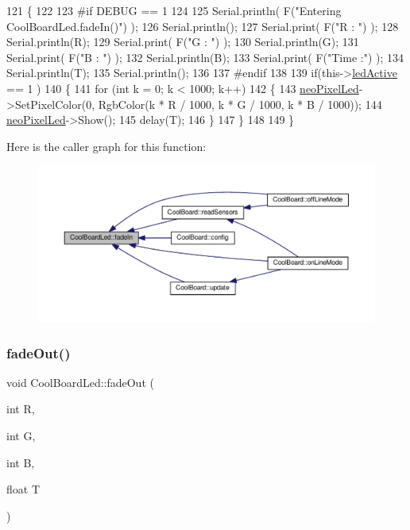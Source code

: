\begin{DoxyCode}
121 \{
122 
123 \textcolor{preprocessor}{#if DEBUG == 1}
124 
125     Serial.println( F(\textcolor{stringliteral}{"Entering CoolBoardLed.fadeIn()"}) );
126     Serial.println();
127     Serial.print( F(\textcolor{stringliteral}{"R : "}) );
128     Serial.println(R);
129     Serial.print( F(\textcolor{stringliteral}{"G : "}) );
130     Serial.println(G);
131     Serial.print( F(\textcolor{stringliteral}{"B : "}) );
132     Serial.println(B);
133     Serial.print( F(\textcolor{stringliteral}{"Time :"}) );
134     Serial.println(T);
135     Serial.println();
136 
137 \textcolor{preprocessor}{#endif  }
138     
139     \textcolor{keywordflow}{if}(this->\hyperlink{class_cool_board_led_aadd04d2ecf123247718d77f42fba7f08}{ledActive} == 1 )
140     \{
141         \textcolor{keywordflow}{for} (\textcolor{keywordtype}{int} k = 0; k < 1000; k++) 
142         \{
143             \hyperlink{class_cool_board_led_ac2c13fa462a010cd9242bf297c013923}{neoPixelLed}->SetPixelColor(0, RgbColor(k * R / 1000, k * G / 1000, k * B / 1000));
144             \hyperlink{class_cool_board_led_ac2c13fa462a010cd9242bf297c013923}{neoPixelLed}->Show();
145             delay(T);
146         \}
147     \}
148 
149 \}
\end{DoxyCode}
Here is the caller graph for this function\+:\nopagebreak
\begin{figure}[H]
\begin{center}
\leavevmode
\includegraphics[width=350pt]{de/dc0/class_cool_board_led_ab778f5e7bed0ab74e3906d82110493c3_icgraph}
\end{center}
\end{figure}
\mbox{\label{class_cool_board_led_a93d545679237e8cc858324367149775c}} 
\subsubsection{\texorpdfstring{fade\+Out()}{fadeOut()}}
{\footnotesize\ttfamily void Cool\+Board\+Led\+::fade\+Out (\begin{DoxyParamCaption}\item[{int}]{R,  }\item[{int}]{G,  }\item[{int}]{B,  }\item[{float}]{T }\end{DoxyParamCaption})}


